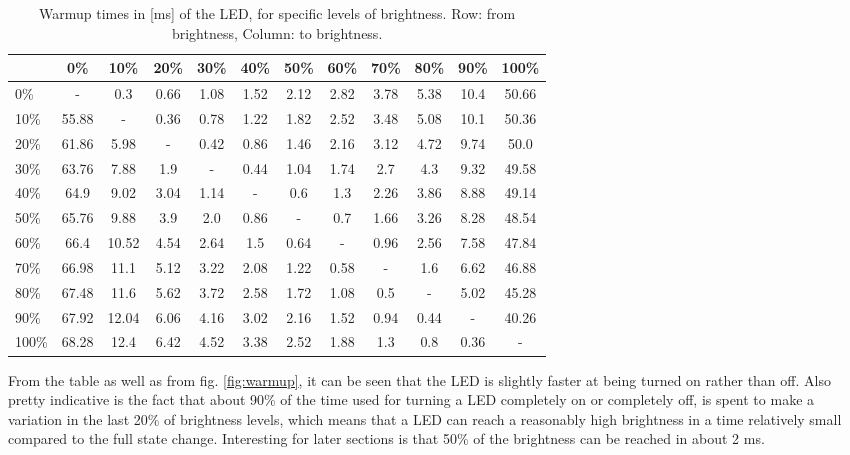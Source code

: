 \begin{table}[hbt]
\centering
  \begin{tabular}{ l | c c c c c c c c c c c}
    & 0\% & 10\% & 20\% & 30\% & 40\% & 50\% & 60\% & 70\% & 80\% & 90\% & 100\% \\
    \hline
0\% & - & 0.3 & 0.66 & 1.08 & 1.52 & 2.12 & 2.82 & 3.78 & 5.38 & 10.4 & 50.66 \\
10\% & 55.88 & - & 0.36 & 0.78 & 1.22 & 1.82 & 2.52 & 3.48 & 5.08 & 10.1 & 50.36 \\
20\% & 61.86 & 5.98 & - & 0.42 & 0.86 & 1.46 & 2.16 & 3.12 & 4.72 & 9.74 & 50.0 \\
30\% & 63.76 & 7.88 & 1.9 & - & 0.44 & 1.04 & 1.74 & 2.7 & 4.3 & 9.32 & 49.58 \\
40\% & 64.9 & 9.02 & 3.04 & 1.14 & - & 0.6 & 1.3 & 2.26 & 3.86 & 8.88 & 49.14 \\
50\% & 65.76 & 9.88 & 3.9 & 2.0 & 0.86 & - & 0.7 & 1.66 & 3.26 & 8.28 & 48.54 \\
60\% & 66.4 & 10.52 & 4.54 & 2.64 & 1.5 & 0.64 & - & 0.96 & 2.56 & 7.58 & 47.84 \\
70\% & 66.98 & 11.1 & 5.12 & 3.22 & 2.08 & 1.22 & 0.58 & - & 1.6 & 6.62 & 46.88 \\
80\% & 67.48 & 11.6 & 5.62 & 3.72 & 2.58 & 1.72 & 1.08 & 0.5 & - & 5.02 & 45.28 \\
90\% & 67.92 & 12.04 & 6.06 & 4.16 & 3.02 & 2.16 & 1.52 & 0.94 & 0.44 & - & 40.26 \\
100\% & 68.28 & 12.4 & 6.42 & 4.52 & 3.38 & 2.52 & 1.88 & 1.3 & 0.8 & 0.36 & - \\
  \end{tabular}
  \centering
  \caption{Warmup times in [ms] of the LED, for specific levels of brightness. Row: from brightness, Column: to brightness.}
  \label{tab:warmup}
\end{table}

From the table as well as from fig. \ref{fig:warmup}, it can be seen that the LED is slightly faster at being turned on rather than off.
Also pretty indicative is the fact that about 90\% of the time used for turning a LED completely on or completely off, is spent to make a variation in the last 20\% of brightness levels, which means that a LED can reach a reasonably high brightness in a time relatively small compared to the full state change.
Interesting for later sections is that 50\% of the brightness can be reached in about 2 ms.

